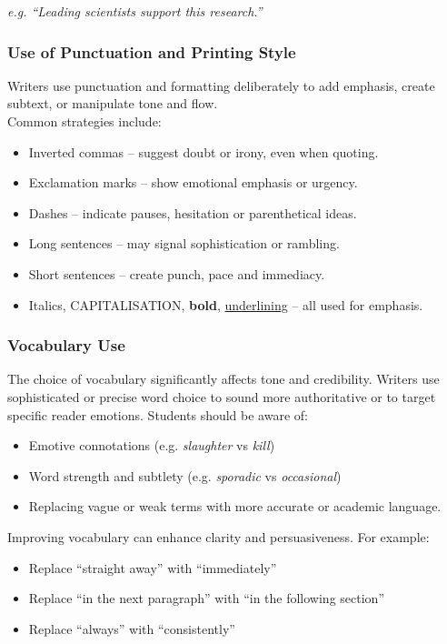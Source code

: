 \documentclass[a4paper]{article}
\begin{document}
\textit{e.g. “Leading scientists support this research.”}

\subsubsection{Use of Punctuation and Printing Style}
Writers use punctuation and formatting deliberately to add emphasis, create subtext, or manipulate tone and flow.\\
Common strategies include:
\begin{itemize}
  \item Inverted commas – suggest doubt or irony, even when quoting.
  \item Exclamation marks – show emotional emphasis or urgency.
  \item Dashes – indicate pauses, hesitation or parenthetical ideas.
  \item Long sentences – may signal sophistication or rambling.
  \item Short sentences – create punch, pace and immediacy.
  \item Italics, CAPITALISATION, \textbf{bold}, \underline{underlining} – all used for emphasis.
\end{itemize}

\subsubsection{Vocabulary Use}
The choice of vocabulary significantly affects tone and credibility. Writers use sophisticated or precise word choice to sound more authoritative or to target specific reader emotions. Students should be aware of:
\begin{itemize}
  \item Emotive connotations (e.g. \textit{slaughter} vs \textit{kill})
  \item Word strength and subtlety (e.g. \textit{sporadic} vs \textit{occasional})
  \item Replacing vague or weak terms with more accurate or academic language.
\end{itemize}
Improving vocabulary can enhance clarity and persuasiveness. For example:
\begin{itemize}
  \item Replace “straight away” with “immediately”
  \item Replace “in the next paragraph” with “in the following section”
  \item Replace “always” with “consistently”
\end{itemize}
\end{document}
